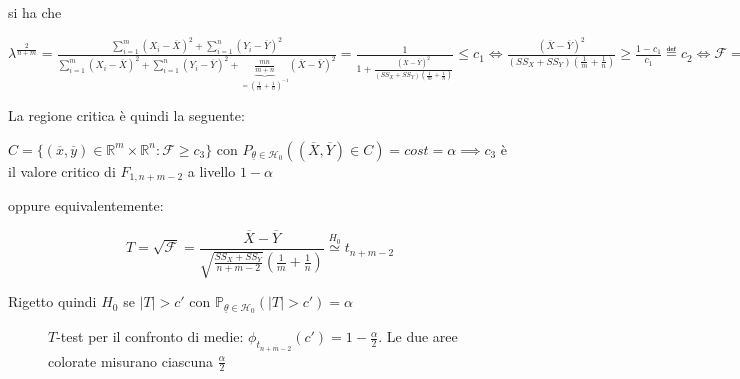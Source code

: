 \documentclass[hidelinks, 10pt]{report}
\begin{document}
si ha che

$ \lambda^{\frac{2}{n + m}} = \frac{\sum\limits_{i = 1}^{m} (X_{i} - \overline{X})^{2} + \sum\limits_{i = 1}^{n} (Y_{i} - \overline{Y})^{2}}{\sum\limits_{i = 1}^{m} (X_{i} - \overline{X})^{2} + \sum\limits_{i = 1}^{n} (Y_{i} - \overline{Y})^{2} + \underbrace{\frac{mn}{m + n}}_{= \left( \frac{1}{m} + \frac{1}{n} \right)^{-1}} (\overline{X} - \overline{Y})^{2}} = \frac{1}{1 + \frac{ (\overline{X} - \overline{Y})^{2}}{(SS_{X}  + SS_{Y}) \left( \frac{1}{m} + \frac{1}{n} \right)}} \le c_{1} \iff \frac{(\overline{X} - \overline{Y})^{2}}{(SS_{X} + SS_{Y}) \left( \frac{1}{m} + \frac{1}{n} \right)} \ge \frac{1 - c_1}{c_1} \eqdef c_2 \iff \mathcal{F} = \frac{(\overline{X} - \overline{Y})^{2} (m + n - 2)}{(SS_{X} + SS_{Y}) \left( \frac{1}{m} + \frac{1}{n} \right)} \ge c_2 (m + n -2) \eqdef c_{3} $

La regione critica \`e quindi la seguente:

$ C = \{ (\overline{x}, \overline{y}) \in \mathbb{R}^{m} \times \mathbb{R}^{n} : \mathcal{F} \ge c_{3} \} $ con $ P_{\underline{\theta} \in \mathcal{H}_{0}} \left( (\overline{X}, \overline{Y}) \in C \right) = cost = \alpha \implies c_3 $ \`e il valore critico di $ F_{1, n + m - 2} $ a livello $ 1 - \alpha $


oppure equivalentemente:

\[ T = \sqrt{\mathcal{F}} = \frac{\overline{X} - \overline{Y}}{\sqrt{\frac{SS_{X} + SS_{Y}}{n + m - 2}} \left( \frac{1}{m} + \frac{1}{n} \right)} \stackrel{H_{0}}{\simeq} t_{n + m - 2} \] 

Rigetto quindi $ H_{0} $ se $ \vert T \vert > c' $ con $ \mathbb{P}_{\underline{\theta} \in \mathcal{H}_{0}} (\vert T \vert > c') = \alpha $

\begin{figure}[H]
\caption{$ T $-test per il confronto di medie: $ \phi_{t_{n + m - 2}} (c') = 1 - \frac{\alpha}{2} $. Le due aree colorate misurano ciascuna $ \frac{\alpha}{2} $}
\end{figure}
\end{document}
